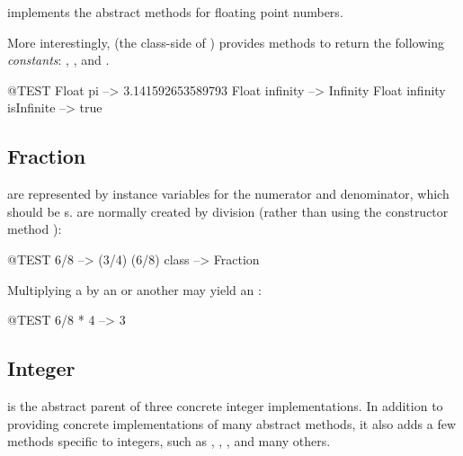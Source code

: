 \documentclass[a4paper,10pt,twoside]{book}
\begin{document}
 implements the abstract  methods for floating point numbers.

More interestingly,  (\ie the class-side of ) provides methods to return the following \emph{constants}: , ,  and .

\begin{code}{@TEST}
Float pi                      --> 3.141592653589793
Float infinity               --> Infinity
Float infinity isInfinite --> true
\end{code}

\subsection{Fraction}

 are represented by instance variables for the numerator and denominator, which should be s.  are normally created by  division (rather than using the constructor method ):

\begin{code}{@TEST}
6/8             --> (3/4)
(6/8) class --> Fraction
\end{code}

Multiplying a  by an  or another  may yield an :

\begin{code}{@TEST}
6/8 * 4 --> 3
\end{code}


\subsection{Integer}

 is the abstract parent of three concrete integer implementations. In addition to providing concrete implementations of many abstract  methods, it also adds a few methods specific to integers, such as , , ,  and many others.
\end{document}

